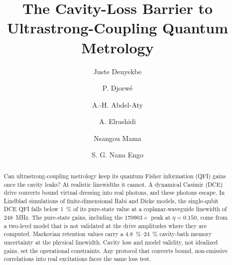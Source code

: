 \documentclass[aps,prxquantum,preprint,superscriptaddress,amsmath,amssymb]{revtex4-2}
\begin{document}
\title{The Cavity-Loss Barrier to Ultrastrong-Coupling Quantum Metrology}

\author{Juste Deuyekbe}

\author{P. Djorw\'e}

\author{A.-H. Abdel-Aty}

\author{A. Elrashidi}

\author{Nsangou Mama}

\author{S. G. Nana Engo}

\begin{abstract}
Can ultrastrong-coupling metrology keep its quantum Fisher information (QFI) gains once the cavity leaks? At realistic linewidths it cannot. A dynamical Casimir (DCE) drive converts bound virtual dressing into real photons, and these photons escape. In Lindblad simulations of finite-dimensional Rabi and Dicke models, the single-qubit DCE QFI falls below \qty{1}{\percent} of its pure-state value at a coplanar-waveguide linewidth of \qty{248}{\mega\hertz}. The pure-state gains, including the $\num{170903}\times$ peak at $\eta=\num{0.150}$, come from a two-level model that is not validated at the drive amplitudes where they are computed. Markovian retention values carry a \qty{4.8}{\percent}--\qty{24}{\percent} cavity-bath memory uncertainty at the physical linewidth. Cavity loss and model validity, not idealized gains, set the operational constraints. Any protocol that converts bound, non-emissive correlations into real excitations faces the same loss test.
\end{abstract}

\maketitle
\end{document}
